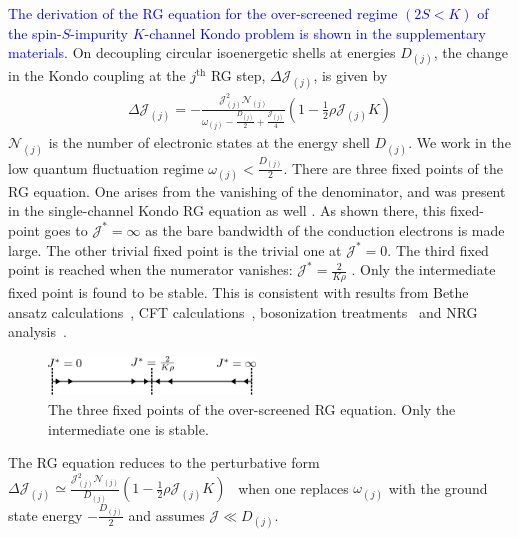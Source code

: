 \documentclass[reprint,prb,superscriptaddress]{revtex4-2}
\begin{document}
\textcolor{blue}{The derivation of the RG equation for the over-screened regime \((2S < K)\) of the spin-\(S\)-impurity \(K\)-channel Kondo problem is shown in the supplementary materials.}
On decoupling circular isoenergetic shells at energies \(D_{(j)}\), the change in the Kondo coupling at the \(j^\text{th}\) RG step, \(\Delta {\mathcal{J}}_{(j)}\), is given by
\begin{equation}\begin{aligned}
	\Delta {\mathcal{J}}_{(j)} = -\frac{{\mathcal{J}}_{(j)}^2 \mathcal{N}_{(j)}}{\omega_{(j)} - \frac{D_{(j)}}{2} + \frac{{\mathcal{J}}_{(j)}}{4}}\left( 1 - \frac{1}{2}\rho {\mathcal{J}}_{(j)} K \right) 
\end{aligned}\end{equation}
\(\mathcal{N}_{(j)}\) is the number of electronic states at the energy shell \(D_{(j)}\). We work in the low quantum fluctuation regime \(\omega_{(j)} < \frac{D_{(j)}}{2}\). There are three fixed points of the RG equation. One arises from the vanishing of the denominator, and was present in the single-channel Kondo RG equation as well \cite{kondo_urg}. As shown there, this fixed-point goes to \({\mathcal{J}}^* = \infty\) as the bare bandwidth of the conduction electrons is made large. The other trivial fixed point is the trivial one at \({\mathcal{J}}^* = 0\). The third fixed point is reached when the numerator vanishes: \({\mathcal{J}}^* = \frac{2}{K \rho}\) \cite{Gan_mchannel_1994,Kogan_2018,Kuramoto1998,Noz_blandin_1980}. Only the intermediate fixed point is found to be stable. This is consistent with results from Bethe ansatz calculations~\cite{Tsvelick_Weigmann_mchannel_1984,andrei_destri_1984,zarand_costi_2002,andrei_jerez_1995,Tsvelick_1985,Tsvelick1984}, CFT calculations~\cite{affleck_1991_overscreen,affleck1993exact,affleck_ludwig_1991}, bosonization treatments~\cite{emery_kivelson,vondelft_prl_1998} and NRG analysis~\cite{pang_cox_1991,mitchell_bulla_2014}.
\begin{figure}[htpb]
	\centering
	\includegraphics[width=0.49\textwidth]{plt/rg_flow.pdf}
	\caption{The three fixed points of the over-screened RG equation. Only the intermediate one is stable.}
	\label{rg_flow}
\end{figure}

The RG equation reduces to the perturbative form \(\Delta {\mathcal{J}}_{(j)} \simeq \frac{{\mathcal{J}}_{(j)}^2 \mathcal{N}_{(j)}}{D_{(j)}}\left( 1 - \frac{1}{2}\rho {\mathcal{J}}_{(j)} K \right)\)~\cite{Kogan_2018,Kuramoto1998,Noz_blandin_1980,tripathi2018landau} when one replaces \(\omega_{(j)}\) with the ground state energy \(-\frac{D_{(j)}}{2}\) and assumes \({\mathcal{J}} \ll D_{(j)}\).
\end{document}

